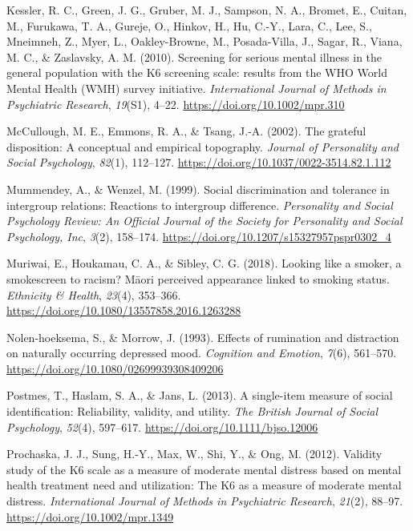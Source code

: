 \documentclass[
  letterpaper,
  DIV=11,
  numbers=noendperiod]{scrartcl}
\newlength{\cslhangindent}
\newlength{\cslentryspacingunit} %
\newenvironment{CSLReferences}[2] %
 {%
  \setlength{\parindent}{0pt}
  \ifodd #1
  \let\oldpar\par
  \def\par{\hangindent=\cslhangindent\oldpar}
  \fi
  \setlength{\parskip}{#2\cslentryspacingunit}
 }%
 {}
\begin{document}
\begin{CSLReferences}{1}{0}
\leavevmode{}%
Kessler, R. C., Green, J. G., Gruber, M. J., Sampson, N. A., Bromet, E.,
Cuitan, M., Furukawa, T. A., Gureje, O., Hinkov, H., Hu, C.-Y., Lara,
C., Lee, S., Mneimneh, Z., Myer, L., Oakley-Browne, M., Posada-Villa,
J., Sagar, R., Viana, M. C., \& Zaslavsky, A. M. (2010). Screening for
serious mental illness in the general population with the K6 screening
scale: results from the WHO World Mental Health (WMH) survey initiative.
\emph{International Journal of Methods in Psychiatric Research},
\emph{19}(S1), 4--22. \url{https://doi.org/10.1002/mpr.310}

\leavevmode{}%
McCullough, M. E., Emmons, R. A., \& Tsang, J.-A. (2002). The grateful
disposition: A conceptual and empirical topography. \emph{Journal of
Personality and Social Psychology}, \emph{82}(1), 112--127.
\url{https://doi.org/10.1037/0022-3514.82.1.112}

\leavevmode{}%
Mummendey, A., \& Wenzel, M. (1999). Social discrimination and tolerance
in intergroup relations: Reactions to intergroup difference.
\emph{Personality and Social Psychology Review: An Official Journal of
the Society for Personality and Social Psychology, Inc}, \emph{3}(2),
158--174. \url{https://doi.org/10.1207/s15327957pspr0302_4}

\leavevmode{}%
Muriwai, E., Houkamau, C. A., \& Sibley, C. G. (2018). Looking like a
smoker, a smokescreen to racism? Māori perceived appearance linked to
smoking status. \emph{Ethnicity \& Health}, \emph{23}(4), 353--366.
\url{https://doi.org/10.1080/13557858.2016.1263288}

\leavevmode{}%
Nolen-hoeksema, S., \& Morrow, J. (1993). Effects of rumination and
distraction on naturally occurring depressed mood. \emph{Cognition and
Emotion}, \emph{7}(6), 561--570.
\url{https://doi.org/10.1080/02699939308409206}

\leavevmode{}%
Postmes, T., Haslam, S. A., \& Jans, L. (2013). A single-item measure of
social identification: Reliability, validity, and utility. \emph{The
British Journal of Social Psychology}, \emph{52}(4), 597--617.
\url{https://doi.org/10.1111/bjso.12006}

\leavevmode{}%
Prochaska, J. J., Sung, H.-Y., Max, W., Shi, Y., \& Ong, M. (2012).
Validity study of the K6 scale as a measure of moderate mental distress
based on mental health treatment need and utilization: The K6 as a
measure of moderate mental distress. \emph{International Journal of
Methods in Psychiatric Research}, \emph{21}(2), 88--97.
\url{https://doi.org/10.1002/mpr.1349}


\end{CSLReferences}
\end{document}
